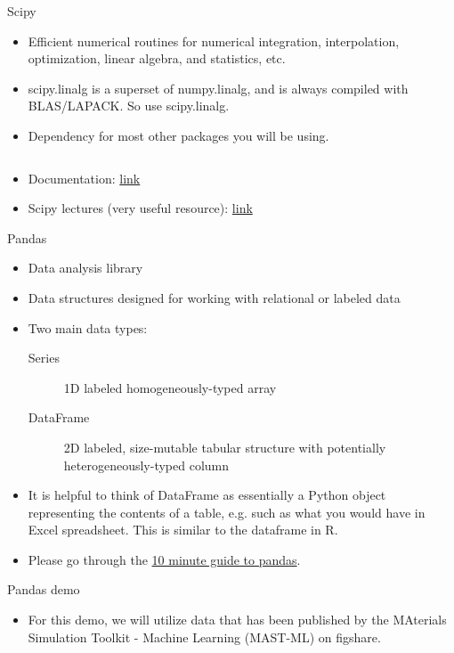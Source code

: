 \documentclass[aspectratio=169]{beamer}
\begin{document}
\begin{frame}[fragile]{Scipy}
    \begin{itemize}
        \item Efficient numerical routines for numerical integration, interpolation, optimization, linear algebra, and statistics, etc.
        \item scipy.linalg is a superset of numpy.linalg, and is always compiled with BLAS/LAPACK. So use scipy.linalg.
        \item Dependency for most other packages you will be using.
    \inputminted{python}{example_scipy.py}
    \item Documentation: \href{https://docs.scipy.org/doc/scipy/reference/}{link}
    \item Scipy lectures (very useful resource): \href{https://scipy-lectures.org/}{link}
    \end{itemize}
\end{frame}


\begin{frame}{Pandas}
    \begin{itemize}
        \item Data analysis library
        \item Data structures designed for working with relational or labeled data
        \item Two main data types:
        \begin{description}
        \item[Series] 1D labeled homogeneously-typed array
        \item[DataFrame] 2D labeled, size-mutable tabular structure with potentially heterogeneously-typed column
        \end{description}
        \item It is helpful to think of DataFrame as essentially a Python object representing the contents of a table, e.g. such as what you would have in Excel spreadsheet. This is similar to the dataframe in R.
        \item Please go through the \href{http://pandas.pydata.org/pandas-docs/stable/getting_started/10min.html}{10 minute guide to pandas}.
    \end{itemize}
\end{frame}


\begin{frame}[fragile]{Pandas demo}
    \begin{itemize}
        \item For this demo, we will utilize data that has been published by the MAterials Simulation Toolkit - Machine Learning (MAST-ML) on figshare.
    \end{itemize}
\inputminted{python}{example_pandas.py}
\end{frame}
\end{document}
